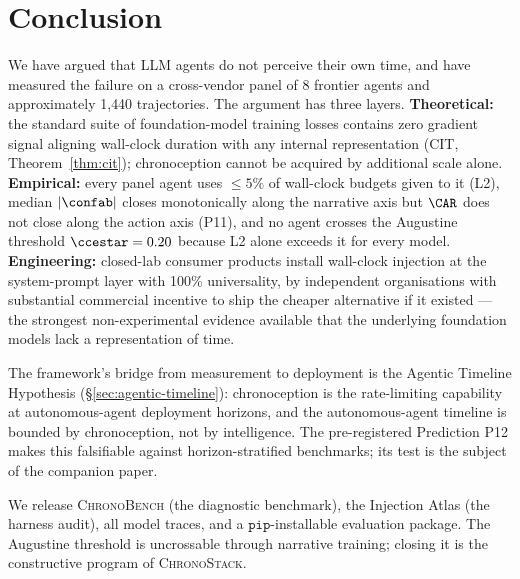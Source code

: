 
\section{Conclusion}
\label{sec:conclusion}

We have argued that LLM agents do not perceive their own time, and have measured the failure on a cross-vendor panel of 8 frontier agents and approximately 1{,}440 trajectories. The argument has three layers. \textbf{Theoretical:} the standard suite of foundation-model training losses contains zero gradient signal aligning wall-clock duration with any internal representation (CIT, Theorem~\ref{thm:cit}); chronoception cannot be acquired by additional scale alone. \textbf{Empirical:} every panel agent uses $\leq 5\%$ of wall-clock budgets given to it (L2), median $|\confab|$ closes monotonically along the narrative axis but $\CAR$ does not close along the action axis (P11), and no agent crosses the Augustine threshold $\ccestar = 0.20$ because L2 alone exceeds it for every model. \textbf{Engineering:} closed-lab consumer products install wall-clock injection at the system-prompt layer with 100\% universality, by independent organisations with substantial commercial incentive to ship the cheaper alternative if it existed --- the strongest non-experimental evidence available that the underlying foundation models lack a representation of time.

The framework's bridge from measurement to deployment is the Agentic Timeline Hypothesis (\S\ref{sec:agentic-timeline}): chronoception is the rate-limiting capability at autonomous-agent deployment horizons, and the autonomous-agent timeline is bounded by chronoception, not by intelligence. The pre-registered Prediction P12 makes this falsifiable against horizon-stratified benchmarks; its test is the subject of the companion paper.

We release \textsc{ChronoBench} (the diagnostic benchmark), the Injection Atlas (the harness audit), all model traces, and a $\texttt{pip}$-installable evaluation package. The Augustine threshold is uncrossable through narrative training; closing it is the constructive program of \textsc{ChronoStack}.
